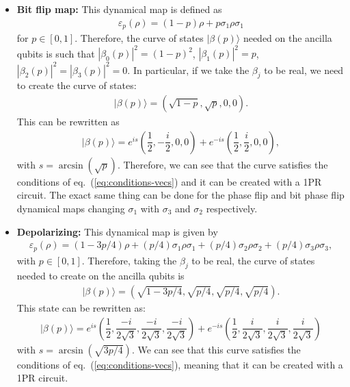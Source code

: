 \documentclass[10pt,letterpaper]{article} %
\newcommand{\eref}[1]{eq.~(\ref{#1})}
\begin{document}
\begin{itemize}
\item \textbf{Bit flip map:} 
This dynamical map is defined as
\begin{align*}
\varepsilon_p(\rho) = (1-p)\rho + p\sigma_1 \rho \sigma_1
\end{align*}
for $p \in [0,1]$. 
Therefore, the curve of states $|\beta(p)\rangle$ needed on the ancilla
qubits is such that 
$|\beta_0(p)|^2= (1-p)^2$, $|\beta_1(p)|^2 = p$, $|\beta_2(p)|^2 = |\beta_3(p)|^2 = 0$.
In particular, if we take the $\beta_j$ to be real,
we need to create the curve of states:
\begin{align*}
|\beta(p)\rangle = \left(\sqrt{1-p},\sqrt{p},0,0\right).
\end{align*}
This can be rewritten as
\begin{align*}
|\beta(p) \rangle = e^{is} \left( \dfrac{1}{2}, - \dfrac{i}{2},0,0 \right) + e^{-is} \left( \dfrac{1}{2}, \dfrac{i}{2},0,0 \right),
\end{align*}
with $s= \arcsin(\sqrt{p})$.
Therefore, we can see that the curve satisfies the conditions of  \eref{eq:conditions-vecs} 
and it can be created with a 1PR circuit.
The exact same thing can be done
for the phase flip and bit phase flip dynamical maps
changing $\sigma_1$ with
$\sigma_3$ and $\sigma_2$ respectively.

\item \textbf{Depolarizing:} This dynamical map is given by
\begin{align*}
\varepsilon_p(\rho) = (1-3p/4) \rho + (p/4) \sigma_1 \rho \sigma_1 + (p/4) \sigma_2 \rho \sigma_2 + (p/4) \sigma_3 \rho \sigma_3,
\end{align*}
with $p \in [0,1]$. 
Therefore, taking the $\beta_j$ to be real,
the curve of states needed to create on the ancilla qubits is
\begin{align*}
|\beta(p) \rangle = \left( \sqrt{1-3p/4}, \sqrt{p/4}, \sqrt{p/4},\sqrt{p/4} \right).
\end{align*}
This state can be rewritten as:
\begin{align*}
|\beta(p)\rangle = e^{is} \left( \dfrac{1}{2}, \dfrac{-i}{2\sqrt{3}},\dfrac{-i}{2\sqrt{3}},\dfrac{-i}{2\sqrt{3}} \right) + e^{-is} \left( \dfrac{1}{2}, \dfrac{i}{2\sqrt{3}},\dfrac{i}{2\sqrt{3}},\dfrac{i}{2\sqrt{3}}\right)
\end{align*}
with $s = \arcsin(\sqrt{3p/4})$.
We can see that this curve satisfies the conditions of \eref{eq:conditions-vecs}, meaning that it can be created with a 
1PR circuit.


\end{itemize}
\end{document}
